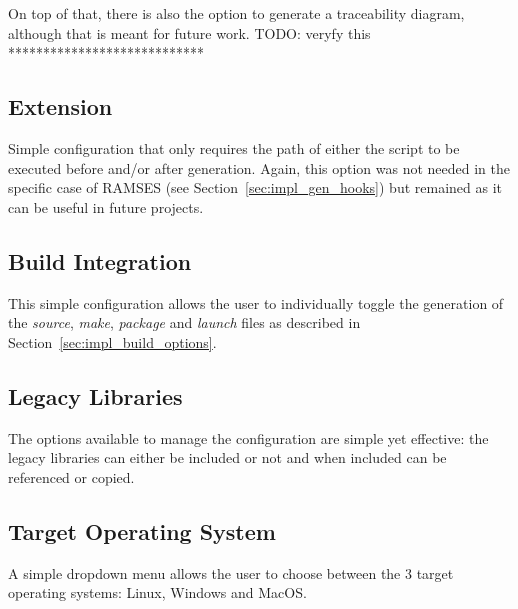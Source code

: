 On top of that, there is also the option to generate a traceability diagram, although that is meant for future work. TODO: veryfy this ****************************



\subsection{Extension}
\label{sec:dsl_ext}

Simple configuration that only requires the path of either the script to be executed before and/or after generation. Again, this option was not needed in the specific case of \gls{RAMSES} (see Section~\ref{sec:impl_gen_hooks}) but remained as it can be useful in future projects.



\subsection{Build Integration}
\label{sec:dsl_build}

This simple configuration allows the user to individually toggle the generation of the \textit{source}, \textit{make}, \textit{package} and \textit{launch} files as described in Section~\ref{sec:impl_build_options}.



\subsection{Legacy Libraries}
\label{sec:dsl_legacy}

The options available to manage the configuration are simple yet effective: the legacy libraries can either be included or not and when included can be referenced or copied.



\subsection{Target Operating System}
\label{sec:dsl_os}

A simple dropdown menu allows the user to choose between the 3 target operating systems: Linux, Windows and MacOS.





















